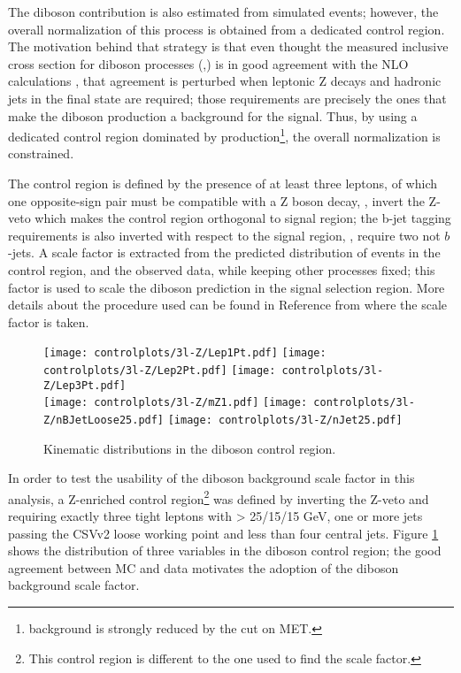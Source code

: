 The diboson contribution is also estimated from simulated events; however, the overall normalization of this process is obtained from a dedicated control region. The motivation behind that strategy is that even thought the measured inclusive cross section for diboson processes (\WZ,\ZZ) is in good agreement with the NLO calculations \cite{CMS_AN_2017-029}, that agreement is perturbed when leptonic Z decays and hadronic jets in the final state are required; those requirements are precisely the ones that make the diboson production a background for the \tHq signal. Thus, by using a dedicated control region dominated by \WZ production\footnote{\ZZ background is strongly reduced by the cut on MET.}, the overall normalization is constrained.

The control region is defined by the presence of at least three leptons, of which one opposite-sign pair must be compatible with a Z boson decay, \ie, invert the Z-veto which makes the control region orthogonal to signal region; the b-jet tagging requirements is also inverted with respect to the signal region, \ie, require two not $b$-jets. A scale factor is extracted from the predicted distribution of \WZ events in the control region, and the observed data, while keeping other processes fixed; this factor is used to scale the diboson prediction in the signal selection region. More details about the procedure used can be found in Reference \cite{CMS_AN_2017-029} from where the scale factor is taken.

\begin{figure} [!h]
\centering
        \texttt{[image: controlplots/3l-Z/Lep1Pt.pdf]}
        \texttt{[image: controlplots/3l-Z/Lep2Pt.pdf]}
        \texttt{[image: controlplots/3l-Z/Lep3Pt.pdf]} \\
        \texttt{[image: controlplots/3l-Z/mZ1.pdf]}
        \texttt{[image: controlplots/3l-Z/nBJetLoose25.pdf]}
        \texttt{[image: controlplots/3l-Z/nJet25.pdf]}
\caption{Kinematic distributions in the diboson control region.}
\label{fig:3lzcontrol}
\end{figure}
              
In order to test the usability of the diboson background scale factor in this analysis, a Z-enriched control region\footnote{This control region is different to the one used to find the scale factor.} was defined by inverting the Z-veto and requiring exactly three tight leptons with \pt > 25/15/15 GeV, one or more jets passing the CSVv2 loose working point and less than four central jets. Figure \ref{fig:3lzcontrol} shows the distribution of three variables in the diboson control region; the good agreement between MC and data motivates the adoption of the diboson background scale factor.

